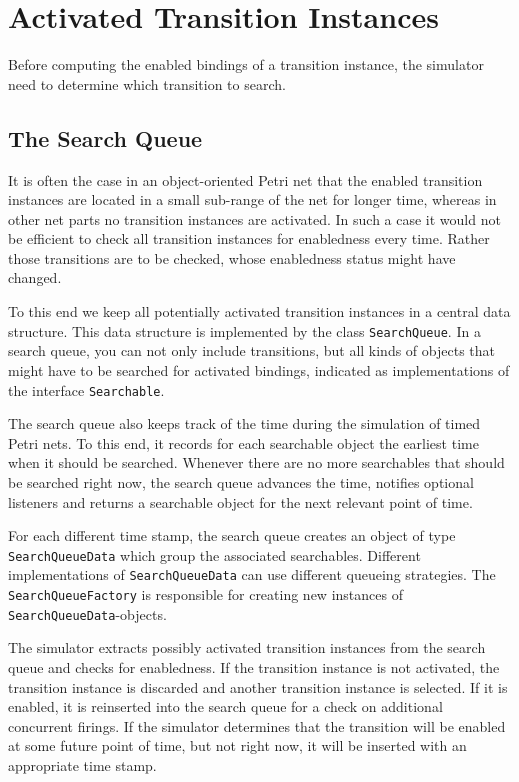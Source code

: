 \section{Activated Transition Instances}

Before computing the enabled bindings of a transition instance,
the simulator need to determine which transition to search.

\subsection{The Search Queue}

It is often the case in an object-oriented Petri net
that the enabled transition instances are located 
in a small sub-range of the net for longer time, whereas 
in other net parts no transition instances are activated. 
In such a case it would not be efficient to check 
all transition instances for enabledness every time. Rather those 
transitions are to be checked, whose enabledness status
might have changed.


To this end we keep all potentially activated transition
instances in a central data structure. 
This data structure is implemented by the class \texttt{SearchQueue}.
In a search queue, 
you can not only include transitions, but all kinds of objects
that might have to be searched for activated bindings, indicated
as implementations of the interface \texttt{Searchable}.

The search queue also keeps track of the time during the
simulation of timed Petri nets. To this end, it records for each
searchable object the earliest time when it should be searched.
Whenever there are no more searchables that should be searched right now,
the search queue advances the time, notifies optional listeners
and returns a searchable object for the next relevant point of time.

For each different time stamp, the search queue
creates an object of type \texttt{SearchQueueData} which group
the associated searchables. Different implementations of
\texttt{SearchQueueData} can use different queueing strategies.
The \texttt{SearchQueueFactory} is responsible for creating
new instances of \texttt{SearchQueueData}-objects.

The simulator extracts possibly activated transition instances 
from the search queue and checks for enabledness.
If the transition instance is not activated, 
the transition instance is discarded 
and another transition instance is selected. If it is enabled, it
is reinserted into the search queue for a check on 
additional concurrent firings. If the simulator determines that the
transition will be enabled at some future point of time, but not right
now, it will be inserted with an appropriate time stamp.

